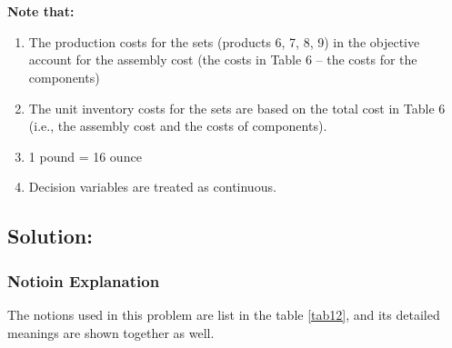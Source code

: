\documentclass[12pt]{article}
\begin{document}
	\
	
	\

	\noindent\textbf{Note that:}
	\begin{enumerate}
		\item The production costs for the sets (products 6, 7, 8, 9) in the objective account for the assembly cost (the costs in Table 6 – the costs for the components) 
		\item The unit inventory costs for the sets are based on the total cost in Table 6 (i.e., the assembly cost and the costs of components).
		\item 1 pound = 16 ounce
		\item Decision variables are treated as continuous.
	\end{enumerate}
	\subsection{Solution:}
	\subsubsection{Notioin Explanation}
	The notions used in this problem are list in the table \ref{tab12}, and its detailed meanings are shown together as well.
\end{document}
